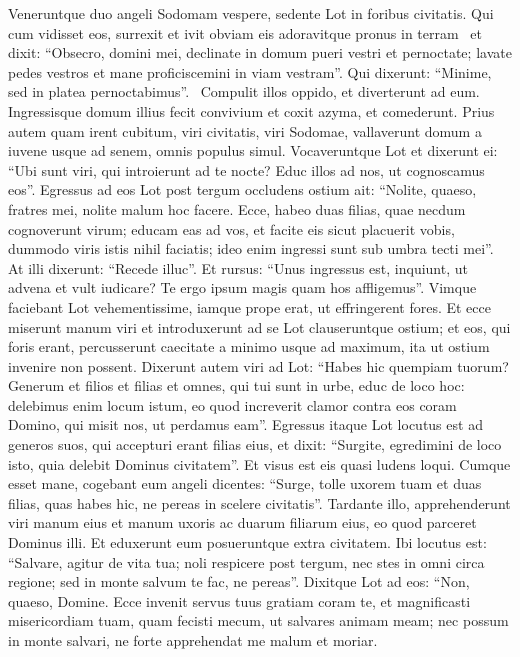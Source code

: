 \begin{biblechapter}  
\verse Veneruntque duo angeli Sodomam vespere, sedente Lot in foribus civitatis. Qui cum vidisset eos, surrexit et ivit obviam eis adoravitque pronus in terram  
\verse et dixit: “Obsecro, domini mei, declinate in domum pueri vestri et pernoctate; lavate pedes vestros et mane proficiscemini in viam vestram”. Qui dixerunt: “Minime, sed in platea pernoctabimus”.  
\verse Compulit illos oppido, et diverterunt ad eum. Ingressisque domum illius fecit convivium et coxit azyma, et comederunt. 
\verse Prius autem quam irent cubitum, viri civitatis, viri Sodomae, vallaverunt domum a iuvene usque ad senem, omnis populus simul. 
\verse Vocaveruntque Lot et dixerunt ei: “Ubi sunt viri, qui introierunt ad te nocte? Educ illos ad nos, ut cognoscamus eos”. 
\verse Egressus ad eos Lot post tergum occludens ostium ait: 
\verse “Nolite, quaeso, fratres mei, nolite malum hoc facere. 
\verse Ecce, habeo duas filias, quae necdum cognoverunt virum; educam eas ad vos, et facite eis sicut placuerit vobis, dummodo viris istis nihil faciatis; ideo enim ingressi sunt sub umbra tecti mei”. 
\verse At illi dixerunt: “Recede illuc”. Et rursus: “Unus ingressus est, inquiunt, ut advena et vult iudicare? Te ergo ipsum magis quam hos affligemus”. Vimque faciebant Lot vehementissime, iamque prope erat, ut effringerent fores. 
\verse Et ecce miserunt manum viri et introduxerunt ad se Lot clauseruntque ostium; 
\verse et eos, qui foris erant, percusserunt caecitate a minimo usque ad maximum, ita ut ostium invenire non possent. 
\verse Dixerunt autem viri ad Lot: “Habes hic quempiam tuorum? Generum et filios et filias et omnes, qui tui sunt in urbe, educ de loco hoc: 
\verse delebimus enim locum istum, eo quod increverit clamor contra eos coram Domino, qui misit nos, ut perdamus eam”. 
\verse Egressus itaque Lot locutus est ad generos suos, qui accepturi erant filias eius, et dixit: “Surgite, egredimini de loco isto, quia delebit Dominus civitatem”. Et visus est eis quasi ludens loqui. 
\verse Cumque esset mane, cogebant eum angeli dicentes: “Surge, tolle uxorem tuam et duas filias, quas habes hic, ne pereas in scelere civitatis”. 
\verse Tardante illo, apprehenderunt viri manum eius et manum uxoris ac duarum filiarum eius, eo quod parceret Dominus illi. 
\verse Et eduxerunt eum posueruntque extra civitatem. Ibi locutus est: “Salvare, agitur de vita tua; noli respicere post tergum, nec stes in omni circa regione; sed in monte salvum te fac, ne pereas”.  
\verse Dixitque Lot ad eos: “Non, quaeso, Domine. 
\verse Ecce invenit servus tuus gratiam coram te, et magnificasti misericordiam tuam, quam fecisti mecum, ut salvares animam meam; nec possum in monte salvari, ne forte apprehendat me malum et moriar. 

\end{biblechapter}
